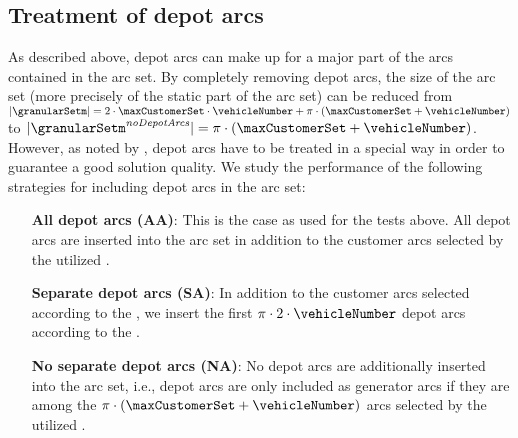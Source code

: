 \documentclass[11pt,a4paper,fleqn]{article}
\begin{document}
\paragraph*{} 

\subsection{Treatment of depot arcs}
\label{sec:53}
As described above, depot arcs can make up for a major part of the arcs contained in the \reduced arc set. By completely removing depot arcs, the size of the \reduced arc set (more precisely of the static part of the \reduced arc set) can be reduced from  $|\granularSetm| = 2 \cdot \maxCustomerSet \cdot \vehicleNumber + \pi \cdot (\maxCustomerSet+\vehicleNumber)$ to  $|\granularSetm^{\mathit{noDepotArcs}}| =  \pi \cdot (\maxCustomerSet+\vehicleNumber)$. However, as noted by \citet{toth:03}, depot arcs have to be treated in a special way in order to guarantee a  good solution quality. We study the performance of the following strategies for including depot arcs in the \reduced arc set:
\begin{itemize}
\item [\textbf{All depot arcs (AA)}:] This is the \base case as used for the tests above. All depot arcs are inserted into the \reduced arc set in addition to the customer arcs selected by the utilized \sm. 
\item [\textbf{Separate depot arcs (SA)}:] In addition to the customer arcs selected according to the \sm, we  insert the first $\pi \cdot 2 \cdot \vehicleNumber$ depot arcs according to the \sm. 
\item [\textbf{No separate depot arcs (NA)}:] No depot arcs are additionally inserted into the \reduced arc set, i.e., depot arcs are only included as generator arcs if they are among the $\pi \cdot (\maxCustomerSet+\vehicleNumber)$ arcs selected by the utilized \sm. 
\end{itemize}
\end{document}
